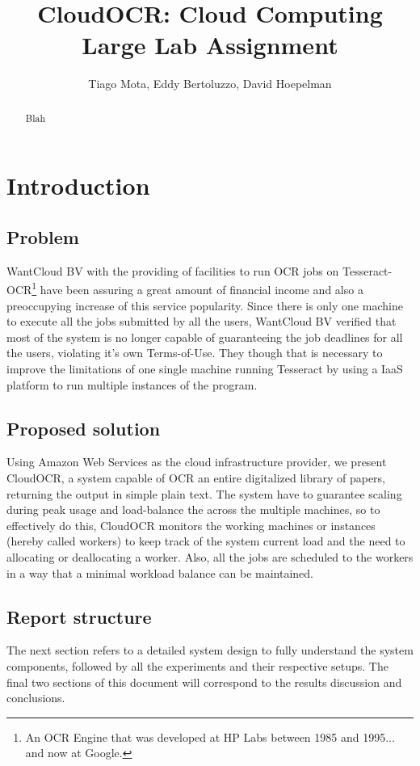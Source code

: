 \documentclass[a4paper]{IEEEtran}
\title{CloudOCR: Cloud Computing Large Lab Assignment}
\author{Tiago Mota, Eddy Bertoluzzo, David Hoepelman}
\begin{document}
\maketitle

\begin{abstract}

Blah
\end{abstract}

\section{Introduction}


\subsection{Problem}
WantCloud BV with the providing of facilities to run OCR jobs on Tesseract-OCR\footnote{An OCR Engine that was developed at HP Labs between 1985 and 1995... and now at Google.} have been assuring a great amount of financial income and also a preoccupying increase of this service popularity. Since there is only one machine to execute all the jobs submitted by all the users, WantCloud BV verified that most of the system is no longer capable of guaranteeing the job deadlines for all the users, violating it's own Terms-of-Use. They though that is necessary to improve the limitations of one single machine running Tesseract by using a IaaS platform to run multiple instances of the program.

\subsection{Proposed solution}
Using Amazon Web Services as the cloud infrastructure provider, we present CloudOCR, a system capable of OCR an entire digitalized library of papers, returning the output in simple plain text. The system have to guarantee scaling during peak usage and load-balance the across the multiple machines, so to effectively do this, CloudOCR monitors the working machines or instances (hereby called workers) to keep track of the system current load and the need to allocating or deallocating a worker. Also, all the jobs are scheduled to the workers in a way that a minimal workload balance can be maintained.

\subsection{Report structure}
The next section refers to a detailed system design to fully understand the system components, followed by all the experiments and their respective setups. The final two sections of this document will correspond to the results discussion and conclusions.
\end{document}
